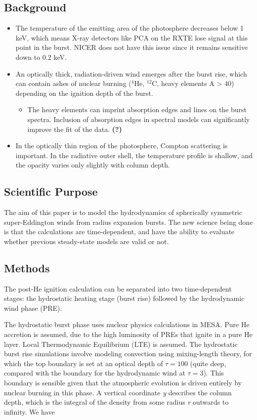 \documentclass[onecolumn]{aastex63}
\begin{document}
\subsection{Background}
\begin{itemize}
    \item The temperature of the emitting area of the photosphere decreases below 1 keV, which means X-ray detectors like PCA on the RXTE lose signal at this point in the burst. NICER does not have this issue since it remains sensitive down to 0.2 keV.
    \item An optically thick, radiation-driven wind emerges after the burst rise, which can contain ashes of nuclear burning ($^4$He, $^{12}$C, heavy elements A > 40) depending on the ignition depth of the burst.
        \begin{itemize}
            \item The heavy elements can imprint absorption edges and lines on the burst spectra. Inclusion of absorption edges in spectral models can significantly improve the fit of the data. \textbf{(?)}
        \end{itemize}
    \item In the optically thin region of the photosphere, Compton scattering is important. In the radiative outer shell, the temperature profile is shallow, and the opacity varies only slightly with column depth.
\end{itemize}
\subsection{Scientific Purpose}
The aim of this paper is to model the hydrodynamics of spherically symmetric super-Eddington winds from radius expansion bursts. The new science being done is that the calculations are time-dependent, and have the ability to evaluate whether previous steady-state models are valid or not. 
\subsection{Methods}

The post-He ignition calculation can be separated into two time-dependent stages: the hydrostatic heating stage (burst rise) followed by the hydrodynamic wind phase (PRE).

The hydrostatic burst phase uses nuclear physics calculations in MESA. Pure He accretion is assumed, due to the high luminosity of PREs that ignite in a pure He layer. Local Thermodynamic Equilibrium (LTE) is assumed. The hydrostatic burst rise simulations involve modeling convection using mixing-length theory, for which the top boundary is set at an optical depth of $\tau = 100$ (quite deep, compared with the boundary for the hydrodynamic wind at $\tau = 3$). This boundary is sensible given that the atmospheric evolution is driven entirely by nuclear burning in this phase. A vertical coordinate \textit{y} describes the column depth, which is the integral of the density from some radius \textit{r} outwards to infinity. We have
\end{document}
